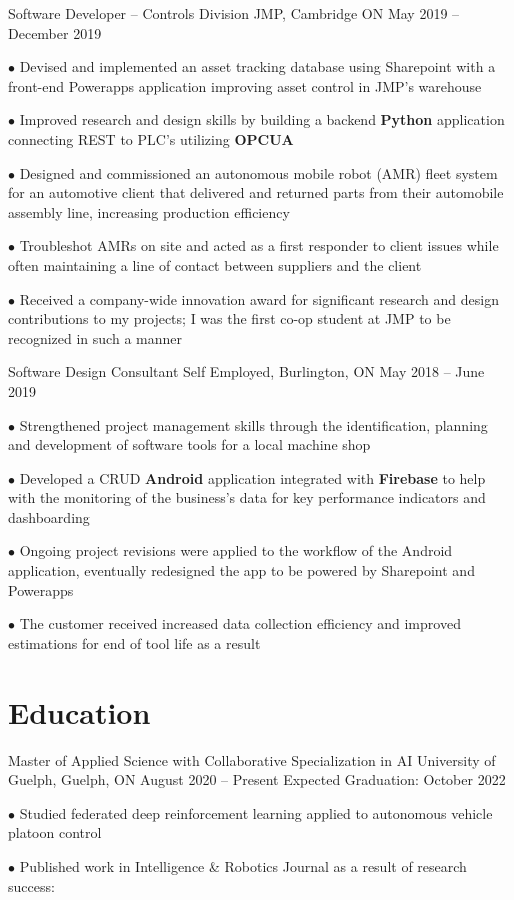 \documentclass[a4paper,11pt]{article}
\newcommand{\sectionsep}{\vspace{-2.5mm}}
\begin{document}
\resumeExp
{Software Developer -- Controls Division}
{JMP, Cambridge ON}
{May 2019 -- December 2019}
{}
\resumeItemListStart
\item[$\bullet$] Devised and implemented an asset tracking database using Sharepoint with a front-end
Powerapps application improving asset control in JMP's warehouse
\item[$\bullet$] Improved research and design skills by building a backend \textbf{Python} application connecting REST
to PLC's utilizing \textbf{OPCUA}
\item[$\bullet$] Designed and commissioned an autonomous mobile robot (AMR) fleet system for an automotive client that delivered and
returned parts from their automobile assembly line, increasing production efficiency
\item[$\bullet$] Troubleshot AMRs on site and acted as a first responder to client issues while often maintaining a
line of contact between suppliers and the client
\item[$\bullet$] Received a company-wide innovation award for significant research and design contributions to
my projects; I was the first co-op student at JMP to be recognized in such a manner
\resumeItemListEnd

\resumeExp
{Software Design Consultant}
{Self Employed, Burlington, ON}
{May 2018 -- June 2019}
{}
\resumeItemListStart
\item[$\bullet$] Strengthened project management skills through the identification, planning and development of
software tools for a local machine shop
\item[$\bullet$] Developed a CRUD \textbf{Android} application integrated with \textbf{Firebase} to help with the monitoring of
the business's data for key performance indicators and dashboarding
\item[$\bullet$] Ongoing project revisions were applied to the workflow of the Android application, eventually
redesigned the app to be powered by Sharepoint and Powerapps
\item[$\bullet$] The customer received increased data collection efficiency and improved estimations for end of
tool life as a result
\resumeItemListEnd

\resumeSubHeadingListEnd
\sectionsep
\section{Education}

\resumeSubHeadingListStart
\resumeEdu
{Master of Applied Science with Collaborative Specialization in AI}
{University of Guelph, Guelph, ON}
{August 2020 -- Present} %
{Expected Graduation: October 2022}
\resumeItemListStart
\item[$\bullet$] Studied federated deep reinforcement learning applied to autonomous vehicle platoon control
\item[$\bullet$] Published work in Intelligence \& Robotics Journal as a result of research success:
\href{https://intellrobot.com/article/view/4885}{\footnotesize{\faExternalLink}}
\resumeItemListEnd
\end{document}
